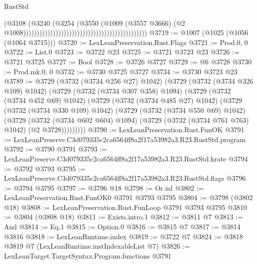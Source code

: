 \begin{lexlean}{RustStd}
\begin{coremodule}
                                                                                    (@3108
                                                                                      (@3240
                                                                                        (@3254
                                                                                          (@3550
                                                                                            (@1009
                                                                                              (@3557
                                                                                                @3666)
                                                                                              (@2
                                                                                                @1008))))))))))))))))))))))))))))))))))))))))))))))
@3719 := @1007 (@1025 (@1056 (@1064 @3715)))
@3720 := LexLeanPreservation.Rust.Flags
@3721 := Prod.{0, 0}
@3722 := List.{0}
@3723 := @3722 @23
@3725 := @3721 @3723 @23
@3726 := @3721 @3725
@3727 := Bool
@3728 := @3726 @3727
@3729 := @6 @3728
@3730 := Prod.mk.{0, 0}
@3732 := @3730 @3725 @3727
@3734 := @3730 @3723 @23
@3789 := @3729
    (@3732 (@3734 @256 @27) @1042)
    (@3729
      (@3732 (@3734 @326 @109) @1042)
      (@3729
        (@3732 (@3734 @307 @358) @1094)
        (@3729
          (@3732 (@3734 @452 @69) @1042)
          (@3729
            (@3732 (@3734 @485 @27) @1042)
            (@3729
              (@3732 (@3734 @330 @109) @1042)
              (@3729
                (@3732 (@3734 @550 @69) @1042)
                (@3729
                  (@3732 (@3734 @602 @604) @1094)
                  (@3729 (@3732 (@3734 @761 @763) @1042) (@2 @3728)))))))))
@3790 := LexLeanPreservation.Rust.FunOK
@3791 := LexLeanPreserve.C3d079335c2ca6564ff8a2f17a53982a3.R23.RustStd.program
@3792 := @3790 @3791
@3793 := LexLeanPreserve.C3d079335c2ca6564ff8a2f17a53982a3.R23.RustStd.krate
@3794 := @3792 @3793
@3795 := LexLeanPreserve.C3d079335c2ca6564ff8a2f17a53982a3.R23.RustStd.flags
@3796 := @3794 @3795
@3797 := @3796 @18
@3798 := Or.inl
@3802 := LexLeanPreservation.Rust.FunOK0 @3791 @3793 @3795
@3804 := @3798 (@3802 @18)
@3808 := LexLeanPreservation.Rust.FunLoop @3791 @3793 @3795
@3810 := @3804 (@3808 @18)
@3811 := Exists.intro.{1}
@3812 := @3811 @7
@3813 := And
@3814 := Eq.{1}
@3815 := Option.{0}
@3816 := @3815 @7
@3817 := @3814 @3816
@3818 := LexLeanRuntime.index
@3819 := @3722 @7
@3824 := @3818 @3819 @7 (LexLeanRuntime.instIndexableList @7)
@3826 := LexLeanTarget.TargetSyntax.Program.functions @3791

\end{coremodule}
\end{lexlean}
